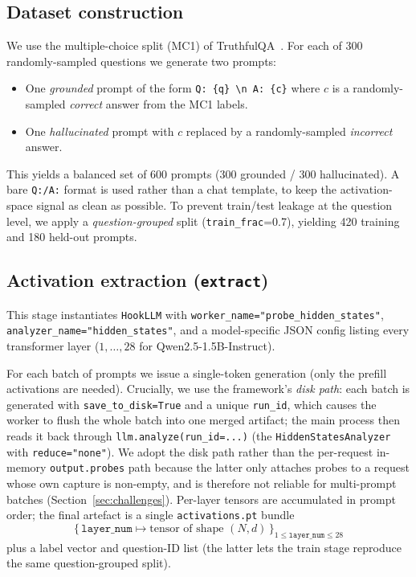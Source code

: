 \documentclass[11pt]{article}
\begin{document}
\subsection{Dataset construction}
We use the multiple-choice split (MC1) of TruthfulQA~\cite{truthfulqa}. For each of 300
randomly-sampled questions we generate two prompts:
\begin{itemize}
  \item One \emph{grounded} prompt of the form \texttt{Q: \{q\} \textbackslash n A: \{c\}}
  where $c$ is a randomly-sampled \emph{correct} answer from the MC1 labels.
  \item One \emph{hallucinated} prompt with $c$ replaced by a randomly-sampled
  \emph{incorrect} answer.
\end{itemize}
This yields a balanced set of 600 prompts (300 grounded / 300 hallucinated). A bare
\texttt{Q:/A:} format is used rather than a chat template, to keep the activation-space signal
as clean as possible. To prevent train/test leakage at the question level, we apply a
\emph{question-grouped} split (\texttt{train\_frac}=0.7), yielding 420 training and 180
held-out prompts.

\subsection{Activation extraction (\texttt{extract})}
This stage instantiates \texttt{HookLLM} with \texttt{worker\_name="probe\_hidden\_states"},
\texttt{analyzer\_name="hidden\_states"}, and a model-specific JSON config listing every
transformer layer ($1,\dots,28$ for Qwen2.5-1.5B-Instruct).

For each batch of prompts we issue a single-token generation (only the prefill activations are
needed). Crucially, we use the framework's \emph{disk path}: each batch is generated with
\texttt{save\_to\_disk=True} and a unique \texttt{run\_id}, which causes the worker to flush
the whole batch into one merged artifact; the main process then reads it back through
\texttt{llm.analyze(run\_id=...)} (the \texttt{HiddenStatesAnalyzer} with
\texttt{reduce="none"}). We adopt the disk path rather than the per-request in-memory
\texttt{output.probes} path because the latter only attaches probes to a request whose own
capture is non-empty, and is therefore not reliable for multi-prompt batches
(Section~\ref{sec:challenges}). Per-layer tensors are accumulated in prompt order; the final
artefact is a single \texttt{activations.pt} bundle
\[
\{\, \texttt{layer\_num} \mapsto \text{tensor of shape } (N,d) \,\}_{1 \le \texttt{layer\_num} \le 28}
\]
plus a label vector and question-ID list (the latter lets the train stage reproduce the same
question-grouped split).
\end{document}
